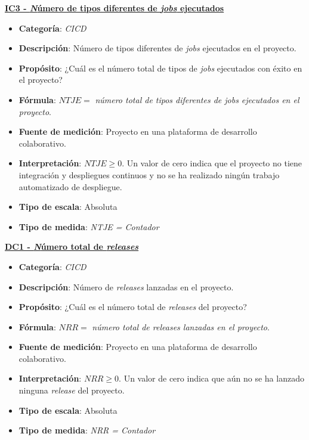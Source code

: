 \textbf{\underline{IC3 - \textit Número de tipos diferentes de \textit{jobs} ejecutados}}
\begin{itemize}
	\item \textbf{Categoría}: \textit{CICD}
	\item \textbf{Descripción}: Número de tipos diferentes de \textit{jobs} ejecutados en el proyecto.
	\item \textbf{Propósito}: ¿Cuál es el número total de tipos de \textit{jobs} ejecutados con éxito en el proyecto?
	\item \textbf{Fórmula}: $NTJE =$ \textit{número total de tipos diferentes de jobs ejecutados en el proyecto}.
	\item \textbf{Fuente de medición}: Proyecto en una plataforma de desarrollo colaborativo.
	\item \textbf{Interpretación}: $NTJE \geq 0$. Un valor de cero indica que el proyecto no tiene integración y despliegues continuos y no se ha realizado ningún trabajo automatizado de despliegue.
	\item \textbf{Tipo de escala}: Absoluta
	\item \textbf{Tipo de medida}: \textit{NTJE = Contador}
\end{itemize}

\textbf{\underline{DC1 - \textit Número total de \textit{releases}}}
\begin{itemize}
	\item \textbf{Categoría}: \textit{CICD}
	\item \textbf{Descripción}: Número de \textit{releases} lanzadas en el proyecto.
	\item \textbf{Propósito}: ¿Cuál es el número total de \textit{releases} del  proyecto?
	\item \textbf{Fórmula}: $NRR =$ \textit{número total de releases lanzadas en el proyecto}.
	\item \textbf{Fuente de medición}: Proyecto en una plataforma de desarrollo colaborativo.
	\item \textbf{Interpretación}: $NRR \geq 0$. Un valor de cero indica que aún no se ha lanzado ninguna \textit{release} del proyecto.
	\item \textbf{Tipo de escala}: Absoluta
	\item \textbf{Tipo de medida}: \textit{NRR = Contador}
\end{itemize}

